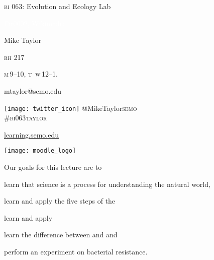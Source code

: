\documentclass[t]{beamer}
\begin{document}
{
\begin{frame}[b,plain]{\textcolor{orange7}{\textsc{bi} 063: Evolution and Ecology Lab}}


\hfill\textcolor{white}{\tiny Fir0002, Wikimedia }
\end{frame}
}

{
\begin{frame}[t,plain]
	\large
	\vspace{5ex}
	\hangpara \hspace{17em} Mike Taylor

	\hangpara \hspace{17em} \textsc{rh} 217

	\hangpara \hspace{17em} \textsc{m}\,9--10, \textsc{t\ w}\,12--1.

	\hangpara \hspace{17em} mtaylor@semo.edu
	
	\hangpara \hspace{17em} \texttt{[image: twitter\_icon]} @MikeTaylor\textsc{semo}\\
	\hspace{17em} \#\textsc{bi}063\textsc{taylor}

\end{frame}
}


\begin{frame}[t]{\href{http://learning.semo.edu}{learning.semo.edu}}
	\begin{center}
		\texttt{[image: moodle\_logo]}
		
		\medskip
		
	\end{center}
	
\end{frame}




\begin{frame}[t]{Our goals for this lecture are to}

	\hangpara learn that science is a process for understanding the natural world,
	
	\hangpara learn and apply the five steps of the 
		
	\hangpara learn and apply 
	
	\hangpara learn the difference between  and  and
	
	\hangpara perform an experiment on bacterial resistance.
	
\end{frame}
\end{document}
